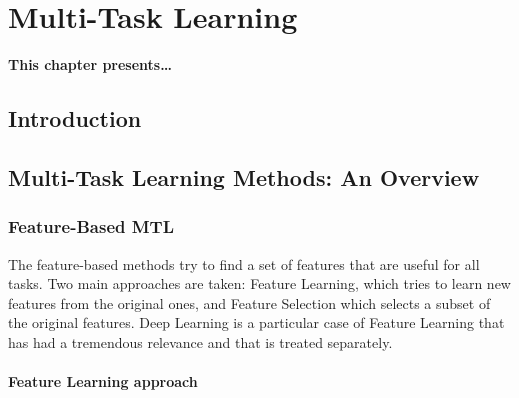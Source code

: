 
\chapter{Multi-Task Learning} %
\label{Chapter2}

{\bf \small{
This chapter presents\dots
}}

\section{Introduction}






\section{Multi-Task Learning Methods: An Overview}

\subsection{Feature-Based MTL}
The feature-based methods try to find a set of features that are useful for all tasks. Two main approaches are taken: Feature Learning, which tries to learn new features from the original ones, and Feature Selection which selects a subset of the original features.
Deep Learning is a particular case of Feature Learning that has had a tremendous relevance and that is treated separately. 

\subsubsection*{Feature Learning approach}


